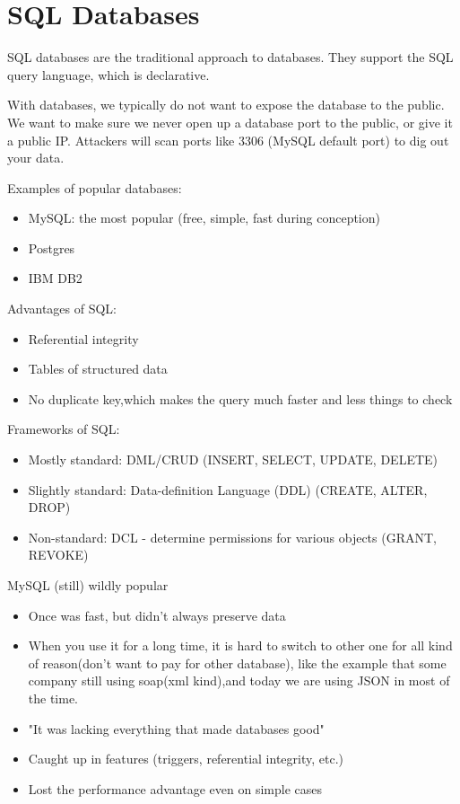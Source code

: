 \documentclass[fancy,11pt,titlestyle=display]{style/elegantbook}
\begin{document}
\section{SQL Databases}

\par SQL databases are the traditional approach to databases. They support the SQL query language, which is declarative.

\par With databases, we typically do not want to expose the database to the public. We want to make sure we never open up a database port to the public, or give it a public IP. Attackers will scan ports like 3306 (MySQL default port) to dig out your data.

\vspace{5mm}
\par \noindent Examples of popular databases:
\begin{itemize}
    \item MySQL: the most popular (free, simple, fast during conception)
    \item Postgres
    \item IBM DB2
\end{itemize}

\par \noindent Advantages of SQL:
\begin{itemize}
    \item Referential integrity
    \item Tables of structured data
    \item No duplicate key,which makes the query much faster and less things to check
\end{itemize}

\par \noindent Frameworks of SQL:
\begin{itemize}
    \item Mostly standard: DML/CRUD (INSERT, SELECT, UPDATE, DELETE)
    \item Slightly standard: Data-definition Language (DDL) (CREATE, ALTER, DROP)
    \item Non-standard: DCL - determine permissions for various objects (GRANT, REVOKE)
\end{itemize}

\par \noindent MySQL (still) wildly popular
\begin{itemize}
    \item Once was fast, but didn't always preserve data
    \item When you use it for a long time, it is hard to switch to other one for all kind of reason(don't want to pay for other database), like the example that some company still using soap(xml kind),and today we are using JSON in most of the time.
    \item "It was lacking everything that made databases good"
    \item Caught up in features (triggers, referential integrity, etc.)
    \item Lost the performance advantage even on simple cases
\end{itemize}
\end{document}

